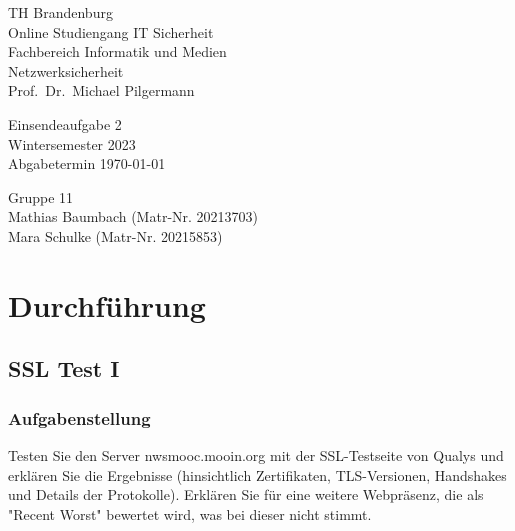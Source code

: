 \documentclass{article}
\begin{document}
\begin{titlepage}
	\begin{flushleft}
		TH Brandenburg \\
		Online Studiengang IT Sicherheit \\
		Fachbereich Informatik und Medien \\
		Netzwerksicherheit \\
		Prof.\ Dr.\ Michael Pilgermann
	\end{flushleft}

	\vfill

	\begin{center}
		\Large{Einsendeaufgabe 2}\\[0.5em]
		\large{Wintersemester 2023}\\[0.25em]
		\large{Abgabetermin \today}
	\end{center}

	\vfill

	\begin{flushright}
		Gruppe 11 \\
		Mathias Baumbach (Matr-Nr. 20213703) \\
		Mara Schulke (Matr-Nr. 20215853)
	\end{flushright}
\end{titlepage}

\begin{abstract}
\end{abstract}

\tableofcontents

\listoffigures

\newpage

\section{Durchführung}

\subsection{SSL Test I}

\subsubsection*{Aufgabenstellung}

Testen Sie den Server nwsmooc.mooin.org mit der SSL-Testseite von Qualys 
und erklären Sie die Ergebnisse (hinsichtlich Zertifikaten, TLS-Versionen,
Handshakes und Details der Protokolle). Erklären Sie für eine weitere
Webpräsenz, die als "Recent Worst" bewertet wird, was bei dieser nicht stimmt. 
\end{document}

